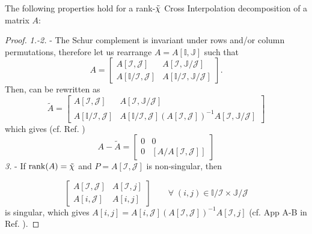\begin{proposition}
	\label{prop:CI}
	The following properties hold for a rank-${\tilde \chi}$ Cross Interpolation decomposition of a matrix $A$: 

	 
\end{proposition}\vspace{-10pt}
\begin{proof}
	\textit{1.-2.} - The Schur complement is invariant under rows and/or column permutations, therefore let us rearrange $A = A[\mathds{I}, \mathds{J}]$ such that
	\begin{equation*}
		A = \begin{bmatrix}
			A[\mathcal{I}, \mathcal{J}] & A[\mathcal{I}, \mathds{J} / \mathcal{J}] \\
			A[\mathds{I} / \mathcal{I}, \mathcal{J}]  & A[\mathds{I} / \mathcal{I}, \mathds{J} / \mathcal{J}]  
		\end{bmatrix}.
	\end{equation*}
Then,  can be rewritten as 
	\begin{equation*}
		\tilde{A} = \begin{bmatrix}
			A[\mathcal{I}, \mathcal{J}] & A[\mathcal{I}, \mathds{J} / \mathcal{J}] \\
			A[\mathds{I} / \mathcal{I}, \mathcal{J}]  &   A[\mathds{I} / \mathcal{I}, \mathcal{J}] \left(A[\mathcal{I}, \mathcal{J}] \right)^{-1} A[\mathcal{I}, \mathds{J} / \mathcal{J}]
		\end{bmatrix}
	\end{equation*}
	which gives (cf. Ref. \cite{Fernandez2024})
	\begin{equation}
		A - \tilde{A} = \begin{bmatrix}
			0 & 0 \\
			0 & [A/A[\mathcal{I}, \mathcal{J}]]
		\end{bmatrix}
	\end{equation}
\textit{3.} - If $\operatorname{rank}\!\left(A\right) = {\tilde \chi}$ and $P = A[\mathcal{I},\mathcal{J}]$ is non-singular, then 

\begin{equation}
	\begin{bmatrix}
		A[\mathcal{I}, \mathcal{J}] & A[\mathcal{I},j] \\
		A[i, \mathcal{J}] & A[i,j]
	\end{bmatrix}\qquad \forall\; (i,j) \in \mathds{I} / \mathcal{I} \times \mathds{J} / \mathcal{J}
\end{equation}
is singular, which gives $ A[i,j] = A[i, \mathcal{J}] \left( A[\mathcal{I}, \mathcal{J}] \right)^{-1} A[\mathcal{I},j]$ (cf. App A-B in Ref. \cite{Fernandez2022}). 
\end{proof}

